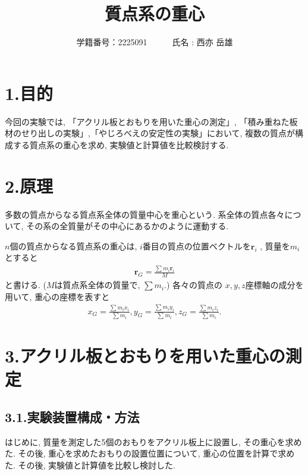 \documentclass{jlreq}
\title{質点系の重心}
\author{学籍番号：2225091~~~~~~氏名 : 西亦 岳雄}
\begin{document}
\maketitle




\section*{1.目的}
今回の実験では, 「アクリル板とおもりを用いた重心の測定」, 
「積み重ねた板材のせり出しの実験」,「やじろべえの安定性の実験」において, 
複数の質点が構成する質点系の重心を求め, 実験値と計算値を比較検討する.



\section*{2.原理}
多数の質点からなる質点系全体の質量中心を重心という. 系全体の質点各々について, 
その系の全質量がその中心にあるかのように運動する. \par

$n$個の質点からなる質点系の重心は, $i$番目の質点の位置ベクトルを$\bm{r}_i$
, 質量を$m_i$とすると
\begin{align}
    \bm{r}_G = \frac{\sum m_i \bm{r}_i}{M}
\end{align}
と書ける. ($M$は質点系全体の質量で, $\sum m_i$.) 各々の質点の
$x,y,z$座標軸の成分を用いて, 重心の座標を表すと
\begin{align}
    x_G = \frac{\sum m_i x_i}{\sum m_i},　y_G = \frac{\sum m_i y_i}{\sum m_i},　z_G = \frac{\sum m_i z_i}{\sum m_i}.
\end{align}



\section*{3.アクリル板とおもりを用いた重心の測定}


\subsection*{3.1.実験装置構成・方法}

はじめに, 質量を測定した5個のおもりをアクリル板上に設置し, その重心を求めた. 
その後, 重心を求めたおもりの設置位置について, 重心の位置を計算で求めた. 
その後, 実験値と計算値を比較し検討した. 
\end{document}

